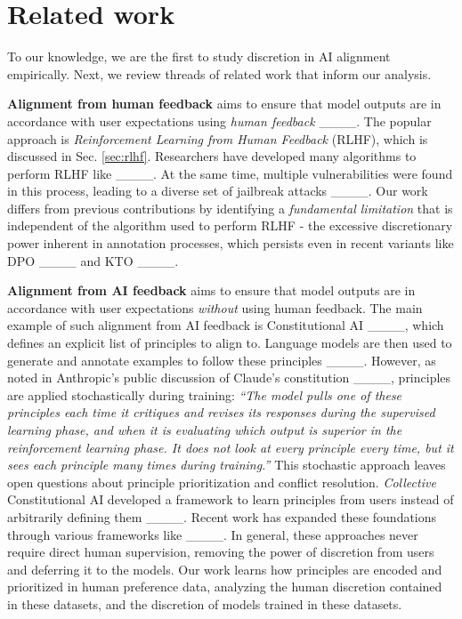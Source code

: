 \section{Related work}
\label{sec:relatedwork}

To our knowledge, we are the first to study discretion in AI alignment empirically. Next, we review threads of related work that inform our analysis.


\noindent \textbf{Alignment from human feedback} aims to ensure that model outputs are in accordance with user expectations using \emph{human feedback} ____. The popular approach is \emph{Reinforcement Learning from Human Feedback} (RLHF), which is discussed in Sec. \ref{sec:rlhf}. Researchers have developed many algorithms to perform RLHF like ____. At the same time, multiple vulnerabilities were found in this process, leading to a diverse set of jailbreak attacks ____. Our work differs from previous contributions by identifying a \emph{fundamental limitation} that is independent of the algorithm used to perform RLHF - the excessive discretionary power inherent in annotation processes, which persists even in recent variants like DPO ____ and KTO ____.

\noindent \textbf{Alignment from AI feedback}
 aims to ensure that model outputs are in accordance with user expectations \emph{without} using human feedback. The main example of such alignment from AI feedback is Constitutional AI ____, which defines an explicit list of principles to align to. Language models are then used to generate and annotate examples to follow these principles  ____. However, as noted in Anthropic's public discussion of Claude's constitution ____, principles are applied stochastically during training: \emph{``The model pulls one of these principles each time it critiques and revises its responses during the supervised learning phase, and when it is evaluating which output is superior in the reinforcement learning phase. It does not look at every principle every time, but it sees each principle many times during training.''} This stochastic approach leaves open questions about principle prioritization and conflict resolution.
\textit{Collective} Constitutional AI developed a framework to learn principles from users instead of arbitrarily defining them ____.
Recent work has expanded these foundations through various frameworks like ____. In general, these approaches never require direct human supervision, removing the power of discretion from users and deferring it to the models.
Our work learns how principles are encoded and prioritized in human preference data, analyzing the human discretion contained in these datasets, and the discretion of models trained in these datasets.


